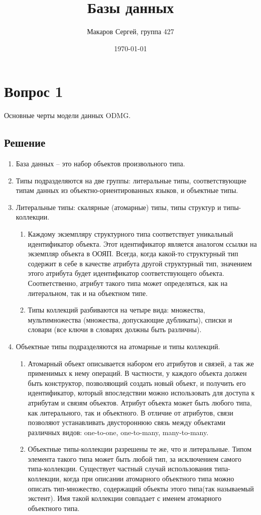 \documentclass[11pt]{article}
\author{Макаров Сергей, группа 427}
\date{\today}
\title{Базы данных}
\begin{document}
\maketitle

\section{Вопрос 1}
\label{sec:org04b8f07}
Основные черты модели данных ODMG.
\subsection{Решение}
\label{sec:orgac92989}
\begin{enumerate}
\item База данных -- это набор объектов произвольного типа.
\item Типы подразделяются на две группы: литеральные типы, соответствующие типам данных из объектно-ориентированных языков, и объектные типы.
\item Литеральные типы: скалярные (атомарные) типы, типы структур и типы-коллекции.
\begin{enumerate}
\item Каждому экземпляру структурного типа соответствует уникальный идентификатор объекта. Этот идентификатор является аналогом ссылки на экземпляр объекта в ООЯП. Всегда, когда какой-то структурный тип содержит в себе в качестве атрибута другой структурный тип, значением этого атрибута будет идентификатор соответствующего объекта. Соответственно, атрибут такого типа может определяться, как на литеральном, так и на объектном типе.
\item Типы коллекций разбиваются на четыре вида: множества, мультимножества (множества, допускающие дубликаты), списки и словари (все ключи в словарях должны быть различны).
\end{enumerate}
\item Объектные типы подразделяются на атомарные и типы коллекций.
\begin{enumerate}
\item Атомарный объект описывается набором его атрибутов и связей, а так же применимых к нему операций. В частности, у каждого объекта должен быть конструктор, позволяющий создать новый объект, и получить его идентификатор, который впоследствии можно использовать для доступа к атрибутам и связям объектов. Атрибут объекта может быть любого типа, как литерального, так и объектного. В отличие от атрибутов, связи позволяют устанавливать двустороннюю связь между объектами различных видов: one-to-one, one-to-many, many-to-many.
\item Объектные типы-коллекции разрешены те же, что и литеральные. Типом элемента такого типа может быть любой тип, за исключением самого типа-коллекции. Существует частный случай использования типа-коллекции, когда при описании атомарного объектного типа можно описать тип-множество, содержащий объекты этого типа(так называемый экстент). Имя такой коллекции совпадает с именем атомарного объектного типа.
\end{enumerate}
\end{enumerate}
\end{document}
